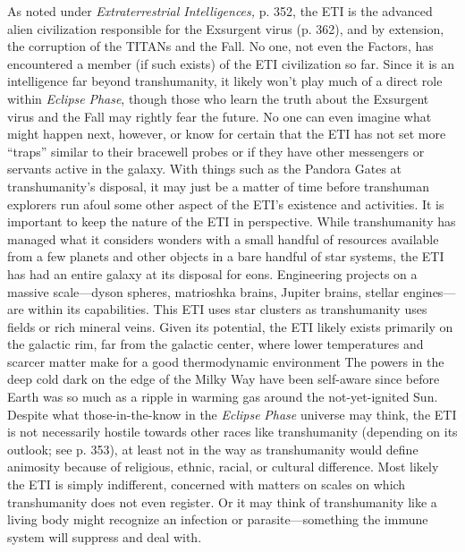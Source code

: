 As noted under \textit{Extraterrestrial Intelligences,} p. 352, 
the ETI is the advanced alien civilization responsible 
for the Exsurgent virus (p. 362), and by extension, 
the corruption of the TITANs and the Fall.
No one, not even the Factors, has encountered a 
member (if such exists) of the ETI civilization so far. 
Since it is an intelligence far beyond transhumanity, it 
likely won't play much of a direct role within \textit{Eclipse }
\textit{Phase}, though those who learn the truth about the 
Exsurgent virus and the Fall may rightly fear the 
future. No one can even imagine what might happen 
next, however, or know for certain that the ETI has 
not set more ``traps'' similar to their bracewell probes 
or if they have other messengers or servants active in 
the galaxy. With things such as the Pandora Gates 
at transhumanity's disposal, it may just be a matter 
of time before transhuman explorers run afoul some 
other aspect of the ETI's existence and activities.
It is important to keep the nature of the ETI in 
perspective. While transhumanity has managed 
what it considers wonders with a small handful of 
resources available from a few planets and other 
objects in a bare handful of star systems, the ETI 
has had an entire galaxy at its disposal for eons. 
Engineering projects on a massive scale—dyson 
spheres, matrioshka brains, Jupiter brains, stellar 
engines—are within its capabilities. This ETI uses 
star clusters as transhumanity uses fields or rich 
mineral veins. Given its potential, the ETI likely 
exists primarily on the galactic rim, far from the 
galactic center, where lower temperatures and 
scarcer matter make for a good thermodynamic environment
The powers in the deep cold dark on the
edge of the Milky Way have been self-aware since 
before Earth was so much as a ripple in warming 
gas around the not-yet-ignited Sun. 
Despite what those-in-the-know in the \textit{Eclipse }
\textit{Phase} universe may think, the ETI is not necessarily
hostile towards other races like transhumanity
(depending on its outlook; see p. 353), at least not 
in the way as transhumanity would define animosity
because of religious, ethnic, racial, or cultural
difference. Most likely the ETI is simply indifferent, 
concerned with matters on scales on which transhumanity
does not even register. Or it may think of
transhumanity like a living body might recognize an 
infection or parasite—something the immune system 
will suppress and deal with.

